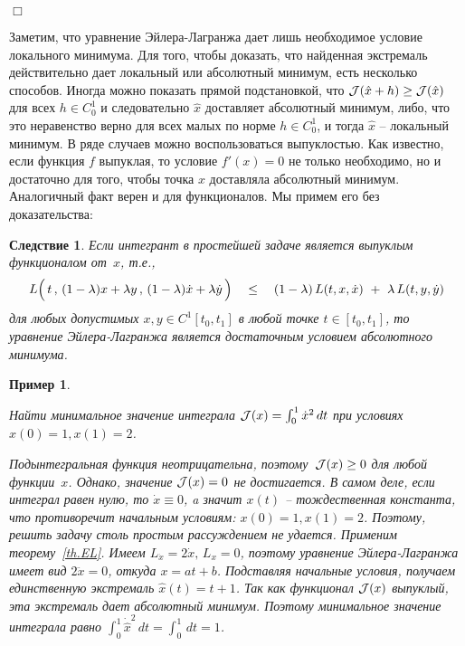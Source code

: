 \documentclass[12pt,a4paper]{article}
\newtheorem{cor}{Следствие}
\newtheorem{ex}{Пример}
\newcommand{\cJ}{{\cal{J}}}
\begin{document}
{\hfill $\Box$}
\smallskip

Заметим, что уравнение Эйлера-Лагранжа дает лишь необходимое условие локального минимума.
Для того, чтобы доказать, что найденная экстремаль действительно дает локальный или абсолютный минимум, есть несколько способов. Иногда можно показать прямой подстановкой, что $\cJ(\hat x + h) \ge \cJ(\hat x)$ для всех
$h \in C^1_0$ и следовательно $\hat x$ доставляет абсолютный минимум, либо, что это неравенство верно для всех малых по норме $h \in C^1_0$, и тогда $\hat x$ -- локальный минимум. В ряде случаев можно воспользоваться выпуклостью. Как известно, если функция
$f$ выпуклая, то  условие
$f'(x) = 0$ не только необходимо, но и достаточно для того, чтобы точка $x$ доставляла абсолютный минимум. Аналогичный факт верен и для функционалов. Мы примем его без доказательства:
\begin{cor}\label{c.2conv}
Если интегрант в простейшей задаче является выпуклым функционалом
от~$x$, т.е.,
$$
L\Bigl(\, t\, , \, (1-\lambda)x  + \lambda y\, , \,
(1-\lambda)\dot x  + \lambda \dot y\, \Bigr)\quad \le \quad
(1-\lambda)\, L(t, x, \dot x)\ + \ \lambda \, L(t, y, \dot y)
$$
для любых допустимых $x, y \in C^1[t_0, t_1]$ в любой точке $t \in
[t_0, t_1]$, то уравнение Эйлера-Лагранжа является достаточным
условием абсолютного минимума.
\end{cor}
\begin{ex}\label{ex.prost1}

Найти минимальное значение интеграла $\cJ(x) = \int_{0}^1  \dot x^2 \, dt$
при условиях $x(0)= 1, x(1) = 2$.
{\em Подынтегральная функция неотрицательна, поэтому~$\cJ(x) \ge 0$ для любой функции~$x$.
Однако, значение $\cJ(x) = 0$ не достигается. В самом деле, если интеграл равен нулю, то $\dot x \equiv 0$,
a значит $x(t)$ -- тождественная константа, что противоречит начальным условиям: $x(0)= 1, x(1) = 2$.
Поэтому, решить задачу столь простым рассуждением не удается. Применим теорему~\ref{th.EL}.
Имеем $L_{\dot x} = 2\dot x, \, L_{x} = 0$, поэтому уравнение Эйлера-Лагранжа имеет вид $2\ddot x = 0$,
откуда $x = at + b$. Подставляя начальные условия, получаем единственную экстремаль $\hat x (t) = t+1$.
Так как функционал $\cJ(x)$ выпуклый, эта экстремаль дает абсолютный минимум. Поэтому минимальное значение
интеграла равно $\int_0^1 {\dot {\hat x}}^2 \, dt = \int_0^1  \, dt = 1$.

}
\end{ex}
\end{document}
